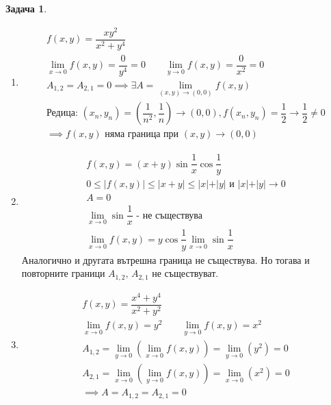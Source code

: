 \documentclass[a4paper,fleqn,12pt]{article}
\theoremstyle{definition}
\newtheorem{task}{Задача}[subsection]
\begin{document}
\begin{task}
\begin{enumerate}
\item 
\begin{gather*}
f(x,y) = \dfrac{xy^2}{x^2+y^4}\\
\lim\limits_{x \to 0} f(x,y) = \dfrac{0}{y^4} = 0 \qquad 
\lim\limits_{y \to 0} f(x,y) = \dfrac{0}{x^2} = 0 \\
A_{1,2} = A_{2,1} = 0 \implies \exists A = \lim\limits_{(x,y) \to (0,0)} f(x,y) \\
\text{Редица: }(x_n, y_n) = \left ( \dfrac{1}{n^2},\dfrac{1}{n}\right ) \to (0,0), f(x_n, y_n) = \dfrac{1}{2} \to \dfrac{1}{2} \neq 0\\
\implies f(x,y) \text{ няма граница при } (x,y) \to (0,0)
\end{gather*}

\item 
\begin{gather*}
f(x,y) = (x+y) \sin{\dfrac{1}{x}} \cos{\dfrac{1}{y}}\\
0 \leq \vert f(x,y) \vert \leq \vert x + y \vert \leq  \vert x \vert + \vert y \vert \text{ и } \vert x \vert + \vert y \vert \to 0 \\
A = 0 \\
\lim\limits_{x \to 0} \sin{\dfrac{1}{x}} \text{ - не съществува} \\
\lim\limits_{x \to 0} f(x,y) = y\cos{\dfrac{1}{y}} \lim\limits_{x \to 0} \sin{\dfrac{1}{x}}
\end{gather*}
Аналогично и другата вътрешна граница не съществува. Но тогава и повторните граници $A_{1,2},\, A_{2,1}$ не съществуват.


\item
\begin{gather*}
f(x,y) = \dfrac{x^4 + y^4}{x^2 + y^2}\\
\lim\limits_{x \to 0} f(x,y) = y^2 \qquad 
\lim\limits_{y \to 0} f(x,y) = x^2 \\
A_{1,2} = \lim\limits_{y \to 0} \left( \lim\limits_{x \to 0} f(x,y) \right) = \lim\limits_{y \to 0} \left( y^2 \right) = 0\\
A_{2,1} = \lim\limits_{x \to 0} \left( \lim\limits_{y \to 0} f(x,y) \right) = \lim\limits_{x \to 0} \left( x^2 \right) = 0 \\
\implies A = A_{1,2} = A_{2,1} = 0
\end{gather*}

\end{enumerate}

\end{task}
\end{document}
